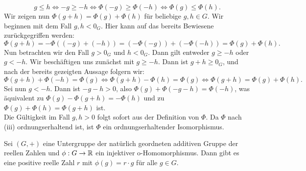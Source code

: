 {\[g \le h \Leftrightarrow -g \geq -h \Leftrightarrow \Phi\left(-g\right) \geq \Phi\left(-h\right) \Leftrightarrow \Phi\left(g\right) \le \Phi\left(h\right).\]
Wir zeigen nun $\Phi(g+h) = \Phi\left(g\right) +\Phi\left(h\right)$ für beliebige $g,h \in G$. Wir beginnen mit dem Fall $g, h < 0_G$. Hier kann auf das bereits Bewiesene zurückgegriffen werden: 
\[\Phi\left(g+h\right) = −\Phi\left((−g)+(−h)\right) = (−\Phi(−g))+(−\Phi(−h)) = \Phi(g)+\Phi(h).\]
Nun betrachten wir den Fall $g>0_G$ und $h < 0_G$. Dann gilt entweder $g\geq −h$ oder $g < -h$. Wir beschäftigen uns zunächst mit $g \geq -h$. Dann ist $g+h \geq 0_G$, und nach der bereits gezeigten Aussage folgern wir:\\
\[\Phi(g+h)+ \Phi(−h) = \Phi(g) \Leftrightarrow \Phi(g+h)−\Phi(h) = \Phi(g) \Leftrightarrow \Phi(g+h) = \Phi(g)+ \Phi(h).\]
Sei nun $g < −h$. Dann ist $−g−h > 0$, also $\Phi(g)+\Phi(−g−h) = \Phi(−h)$, was äquivalent zu $\Phi(g)−\Phi(g+h) = −\Phi(h)$ und zu $\Phi(g)+ \Phi(h) = \Phi(g+ h)$ ist.
\\ Die Gültigkeit im Fall $g,h > 0$ folgt sofort aus der Definition von $\Phi$. 
Da $\Phi$ nach (iii) ordnungserhaltend ist, ist $\Phi$ ein ordnungserhaltender Isomorphismus.}
%
\begin{satz}\label{homomorphismus nach R} %
Sei $\left(G, +\right)$ eine Untergruppe der natürlich geordneten additiven Gruppe der reellen Zahlen und $\phi: G \rightarrow \mathbb{R}$ ein injektiver o-Homomorphismus. Dann gibt es eine positive reelle Zahl $r$ mit $\phi(g) = r\cdot g$ für alle $g \in G$. 
\end{satz}
%
%
